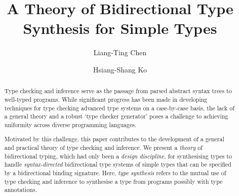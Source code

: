 \documentclass[acmsmall,screen]{acmart}
\theoremstyle{acmdefinition}
\begin{document}
\author{Liang-Ting Chen}
\author{Hsiang-Shang Ko}


\title{A Theory of Bidirectional Type Synthesis for Simple Types}

\begin{abstract}
%
  Type checking and inference serve as the passage from parsed abstract syntax trees to well-typed programs.
  While significant progress has been made in developing techniques for type checking advanced type systems on a case-by-case basis, the lack of a general theory and a robust `type checker generator' poses a challenge to achieving uniformity across diverse programming languages.

  Motivated by this challenge, this paper contributes to the development of a general and practical theory of type checking and inference.
  We present a \emph{theory} of bidirectional typing, which had only been a \emph{design discipline}, for synthesising types to handle \emph{syntax-directed} bidirectional type systems of simple types that can be specified by a bidirectional binding signature.
  Here, \emph{type synthesis} refers to the mutual use of type checking and inference to synthesise a type from programs possibly with type annotations.


\end{abstract}
\end{document}
